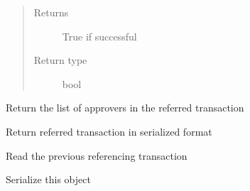 \documentclass[letterpaper,10pt,english]{sphinxmanual}
\begin{document}
\begin{fulllineitems}
\begin{fulllineitems}
\begin{quote}
\begin{description}
\item[{Returns}] \leavevmode
True if successful

\item[{Return type}] \leavevmode
bool

\end{description}\end{quote}

\end{fulllineitems}


\begin{fulllineitems}
\label{\detokenize{bbc1.core.bbclib:bbc1.core.bbclib.BBcReference.get_destinations}}
Return the list of approvers in the referred transaction

\end{fulllineitems}


\begin{fulllineitems}
\label{\detokenize{bbc1.core.bbclib:bbc1.core.bbclib.BBcReference.get_referred_transaction}}
Return referred transaction in serialized format

\end{fulllineitems}


\begin{fulllineitems}
\label{\detokenize{bbc1.core.bbclib:bbc1.core.bbclib.BBcReference.prepare_reference}}
Read the previous referencing transaction

\end{fulllineitems}


\begin{fulllineitems}
\label{\detokenize{bbc1.core.bbclib:bbc1.core.bbclib.BBcReference.serialize}}
Serialize this object

\end{fulllineitems}


\end{fulllineitems}
\end{document}

